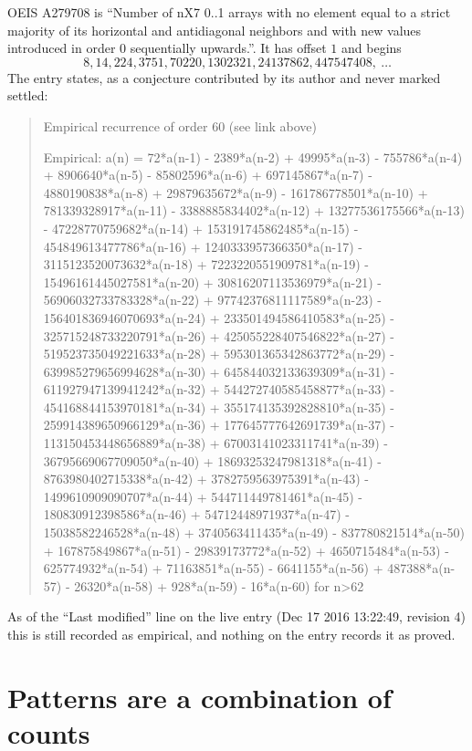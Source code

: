 \documentclass[11pt,a4paper]{article}
\theoremstyle{plain}
\theoremstyle{definition}
\begin{document}
OEIS A279708 is ``Number of nX7 0..1 arrays with no element equal to a strict majority of its horizontal and antidiagonal neighbors and with new values introduced in order 0 sequentially upwards.''. It has offset $1$ and begins
\[
8, 14, 224, 3751, 70220, 1302321, 24137862, 447547408,\ \dots
\]
The entry states, as a conjecture contributed by its author and never marked settled:
\begin{quote}
Empirical recurrence of order 60 (see link above)

Empirical: a(n) = 72*a(n-1) - 2389*a(n-2) + 49995*a(n-3) - 755786*a(n-4) + 8906640*a(n-5) - 85802596*a(n-6) + 697145867*a(n-7) - 4880190838*a(n-8) + 29879635672*a(n-9) - 161786778501*a(n-10) + 781339328917*a(n-11) - 3388885834402*a(n-12) + 13277536175566*a(n-13) - 47228770759682*a(n-14) + 153191745862485*a(n-15) - 454849613477786*a(n-16) + 1240333957366350*a(n-17) - 3115123520073632*a(n-18) + 7223220551909781*a(n-19) - 15496161445027581*a(n-20) + 30816207113536979*a(n-21) - 56906032733783328*a(n-22) + 97742376811117589*a(n-23) - 156401836946070693*a(n-24) + 233501494586410583*a(n-25) - 325715248733220791*a(n-26) + 425055228407546822*a(n-27) - 519523735049221633*a(n-28) + 595301365342863772*a(n-29) - 639985279656994628*a(n-30) + 645844032133639309*a(n-31) - 611927947139941242*a(n-32) + 544272740585458877*a(n-33) - 454168844153970181*a(n-34) + 355174135392828810*a(n-35) - 259914389650966129*a(n-36) + 177645777642691739*a(n-37) - 113150453448656889*a(n-38) + 67003141023311741*a(n-39) - 36795669067709050*a(n-40) + 18693253247981318*a(n-41) - 8763980402715338*a(n-42) + 3782759563975391*a(n-43) - 1499610909090707*a(n-44) + 544711449781461*a(n-45) - 180830912398586*a(n-46) + 54712448971937*a(n-47) - 15038582246528*a(n-48) + 3740563411435*a(n-49) - 837780821514*a(n-50) + 167875849867*a(n-51) - 29839173772*a(n-52) + 4650715484*a(n-53) - 625774932*a(n-54) + 71163851*a(n-55) - 6641155*a(n-56) + 487388*a(n-57) - 26320*a(n-58) + 928*a(n-59) - 16*a(n-60) for n>62
\end{quote}
As of the ``Last modified'' line on the live entry (Dec 17 2016 13:22:49, revision 4) this is still
recorded as empirical, and nothing on the entry records it as proved.

\section{Patterns are a combination of counts}
\end{document}
